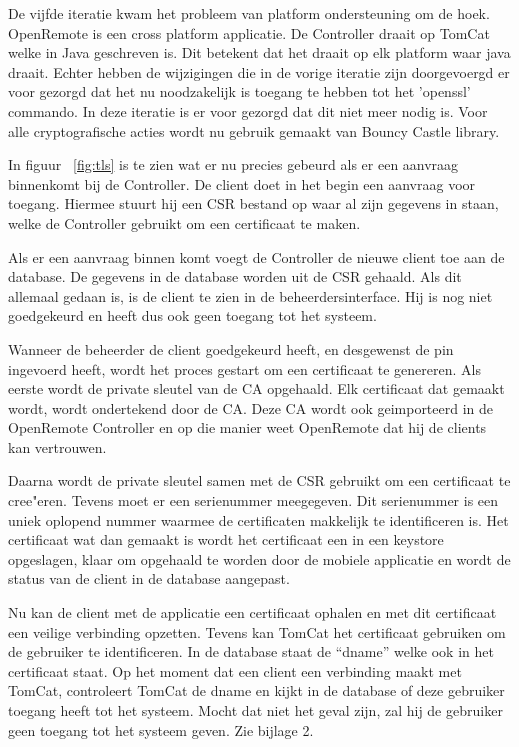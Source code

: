 \documentclass[]{article}
\begin{document}
De vijfde iteratie kwam het probleem van platform ondersteuning om de hoek.
OpenRemote is een cross platform applicatie. De Controller draait op TomCat
welke in Java geschreven is. Dit betekent dat het draait op elk platform waar
java draait. Echter hebben de wijzigingen die in de vorige iteratie zijn
doorgevoergd er voor gezorgd dat het nu noodzakelijk is toegang te hebben tot
het 'openssl' commando. In deze iteratie is er voor gezorgd dat dit niet meer
nodig is. Voor alle cryptografische acties wordt nu gebruik gemaakt van Bouncy
Castle library. 

In figuur ~\ref{fig:tls} is te zien wat er nu precies gebeurd als er een
aanvraag binnenkomt bij de Controller. De client doet in het begin een aanvraag
voor toegang. Hiermee stuurt hij een CSR bestand op waar al zijn gegevens in staan,
welke de Controller gebruikt om een certificaat te maken. 

Als er een aanvraag binnen komt voegt de Controller de nieuwe client toe aan de
database. De gegevens in de database worden uit de CSR gehaald. Als dit allemaal
gedaan is, is de client te zien in de beheerdersinterface. Hij is nog niet
goedgekeurd en heeft dus ook geen toegang tot het systeem.

Wanneer de beheerder de client goedgekeurd heeft, en desgewenst de pin ingevoerd
heeft, wordt het proces gestart om een certificaat te genereren. Als eerste
wordt de private sleutel van de CA opgehaald. Elk certificaat dat gemaakt wordt,
wordt ondertekend door de CA. Deze CA wordt ook geimporteerd in de OpenRemote
Controller en op die manier weet OpenRemote dat hij de clients kan vertrouwen.

Daarna wordt de private sleutel samen met de CSR gebruikt om een certificaat te
cree"eren. Tevens moet er een serienummer meegegeven. Dit serienummer is een
uniek oplopend nummer waarmee de certificaten makkelijk te identificeren is. Het
certificaat wat dan gemaakt is wordt het certificaat een in een keystore
opgeslagen, klaar om opgehaald te worden door de mobiele applicatie en wordt de
status van de client in de database aangepast.

Nu kan de client met de applicatie een certificaat ophalen en met dit
certificaat een veilige verbinding opzetten. Tevens kan TomCat het certificaat
gebruiken om de gebruiker te identificeren. In de database staat de ``dname''
welke ook in het certificaat staat. Op het moment dat een client een verbinding
maakt met TomCat, controleert TomCat de dname en kijkt in de database of deze
gebruiker toegang heeft tot het systeem. Mocht dat niet het geval zijn, zal hij
de gebruiker geen toegang tot het systeem geven.
Zie bijlage 2.
\end{document}
